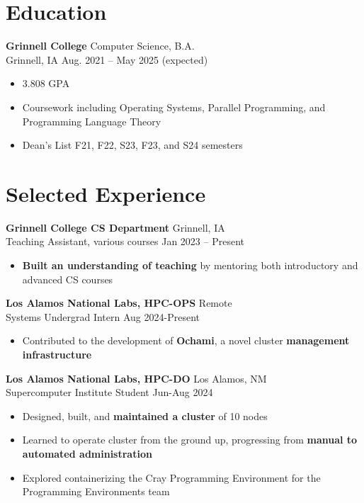 \documentclass[12pt]{article}
\newcommand{\entry}[4]{{{\textbf{#1}}} \hfill #3 \\ #2 \hfill #4}
\begin{document}
\noindent %
\begin{minipage}[t]{0.63\textwidth}

  \section{Education}
  \entry{Grinnell College}{Grinnell, IA}{Computer Science, B.A.}{Aug. 2021 -- May 2025 (expected)}
  \begin{itemize}[noitemsep,rightmargin=0mm,topsep=0pt,leftmargin=.75cm]
    \item 3.808 GPA
    \item Coursework including Operating Systems, Parallel Programming, and Programming Language Theory
    \item Dean's List F21, F22, S23, F23, and S24 semesters
  \end{itemize}
  \vspace{-15pt} %

  \section{Selected Experience}
  \entry{Grinnell College CS Department}{Teaching Assistant, various courses}{Grinnell, IA}{Jan 2023 -- Present}
  \begin{itemize}[noitemsep,rightmargin=0mm,topsep=0pt,leftmargin=.75cm]
    \item {\bf Built an understanding of teaching} by mentoring both introductory and advanced CS courses
  \end{itemize}

  \medskip

  \entry{Los Alamos National Labs, HPC-OPS}{Systems Undergrad Intern}{Remote}{Aug 2024-Present}
  \begin{itemize}[noitemsep,rightmargin=0mm,topsep=0pt,leftmargin=.75cm]
    \item Contributed to the development of {\bf Ochami}, a novel cluster \bf{management infrastructure}
  \end{itemize}

  \medskip

  \entry{Los Alamos National Labs, HPC-DO}{Supercomputer Institute Student}{Los Alamos, NM}{Jun-Aug 2024}
  \begin{itemize}[noitemsep,rightmargin=0mm,topsep=0pt,leftmargin=.75cm]
    \item Designed, built, and {\bf maintained a cluster} of 10 nodes
    \item Learned to operate cluster from the ground up, progressing from {\bf manual to automated administration}
    \item Explored containerizing the Cray Programming Environment for the Programming Environments team
  \end{itemize}


\end{minipage}
\end{document}
